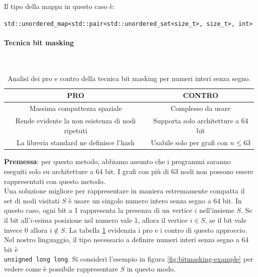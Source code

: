 \noindent Il tipo della mappa in questo caso è:

\begin{center}
    \texttt{std::unordered_map<std::pair<std::unordered_set<size_t>, size_t>, int>}
\end{center}

\paragraph{Tecnica bit masking}\mbox{}\\

\begin{table}
  \centering
    \begin{tabular}{|c | c|}
    \hline
    \textbf{PRO} & \textbf{CONTRO} \\ [0.5ex]
    \hline\hline
    Massima compattezza spaziale & Complesso da usare \\
    \hline
    Rende evidente la non esistenza di nodi ripetuti & Supporta solo architetture a 64 bit \\
    \hline
    La libreria standard ne definisce l'hash & Usabile solo per grafi con $n \leq 63$ \\
    \hline
  \end{tabular}
    \caption{Analisi dei pro e contro della tecnica bit masking per numeri interi senza segno.}
    \label{tab:pro-cons-bit-masking}
\end{table}

\noindent \textbf{Premessa}: per questo metodo, abbiamo assunto che i programmi saranno eseguiti solo su architetture a 64 bit. I grafi con più di 63 nodi non possono essere rappresentati con questo metodo. \\

\noindent Una soluzione migliore per rappresentare in maniera estremamente compatta il set di nodi visitati $S$ è usare un singolo numero intero senza segno a 64 bit. In questo caso, ogni bit a 1 rappresenta la presenza di un vertice $i$ nell'insieme $S$.
Se il bit all'$i$-esima posizione nel numero vale 1, allora il vertice $i \in S$, se il bit vale invece 0 allora $i \notin S$. La tabella \ref{tab:pro-cons-bit-masking} evidenzia i pro e i contro di questo approccio. \\

\noindent Nel nostro linguaggio, il tipo necessario a definire numeri interi senza segno a 64 bit è \\
\texttt{unsigned long long}. Si consideri l'esempio in figura \ref{fig:bitmasking-example} per vedere come è possibile rappresentare $S$ in questo modo.

